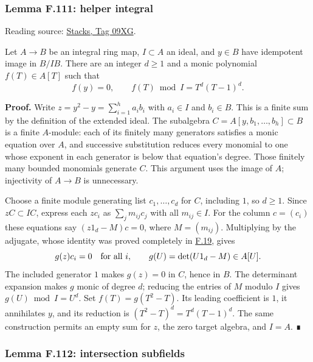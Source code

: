 \documentclass[11pt,a4paper,openany]{report}
\begin{document}
\label{AG-RG-S05-more-algebra-lemma-helper-integral}

\subsubsection{Lemma F.111: helper integral}\label{AG-RG-S05-lemma-f.111-helper-integral}

Reading source: \href{https://stacks.math.columbia.edu/tag/09XG}{Stacks, Tag 09XG}.

Let \(A\to B\) be an integral ring map, \(I\subset A\) an ideal, and \(y\in B\) have idempotent image in \(B/IB\). There are an integer \(d\geq1\) and a monic polynomial \(f(T)\in A[T]\) such that \[
f(y)=0,\qquad f(T)\bmod I=T^d(T-1)^d.
\]

\textbf{Proof.} Write \(z=y^2-y=\sum_{i=1}^h a_ib_i\) with \(a_i\in I\) and \(b_i\in B\). This is a finite sum by the definition of the extended ideal. The subalgebra \(C=A[y,b_1,\ldots,b_h]\subset B\) is a finite \(A\)-module: each of its finitely many generators satisfies a monic equation over \(A\), and successive substitution reduces every monomial to one whose exponent in each generator is below that equation's degree. Those finitely many bounded monomials generate \(C\). This argument uses the image of \(A\); injectivity of \(A\to B\) is unnecessary.

Choose a finite module generating list \(c_1,\ldots,c_d\) for \(C\), including \(1\), so \(d\geq1\). Since \(zC\subset IC\), express each \(zc_i\) as \(\sum_j m_{ij}c_j\) with all \(m_{ij}\in I\). For the column \(c=(c_i)\) these equations say \((z1_d-M)c=0\), where \(M=(m_{ij})\). Multiplying by the adjugate, whose identity was proved completely in \hyperref[AG-RG-S05-algebra-lemma-charpoly]{F.19}, gives \[
g(z)c_i=0\quad\hbox{for all }i,
\qquad g(U)=\det(U1_d-M)\in A[U].
\] The included generator \(1\) makes \(g(z)=0\) in \(C\), hence in \(B\). The determinant expansion makes \(g\) monic of degree \(d\); reducing the entries of \(M\) modulo \(I\) gives \(g(U)\bmod I=U^d\). Set \(f(T)=g(T^2-T)\). Its leading coefficient is \(1\), it annihilates \(y\), and its reduction is \((T^2-T)^d=T^d(T-1)^d\). The same construction permits an empty sum for \(z\), the zero target algebra, and \(I=A\). ∎

\label{AG-RG-S05-more-algebra-lemma-intersection-subfields}

\subsubsection{Lemma F.112: intersection subfields}\label{AG-RG-S05-lemma-f.112-intersection-subfields}
\end{document}
